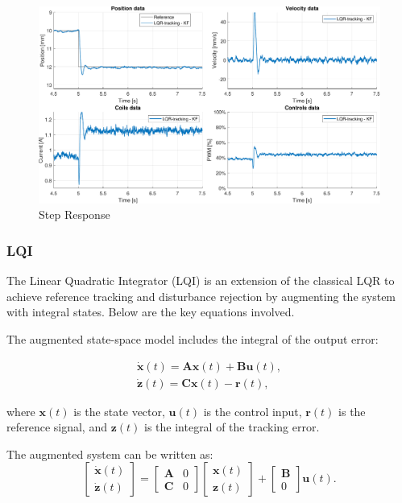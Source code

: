 \begin{figure}[H]
    \centering
    \includegraphics[width=1\linewidth]{./img/MATLAB/results/step_LQR_tracking_KF.pdf}
    \caption{Step Response}
    \label{fig:Step Response}
\end{figure}

\subsubsection{LQI}
\label{subsubsec:lqi}
The Linear Quadratic Integrator (LQI) is an extension of the classical LQR to achieve reference tracking and disturbance rejection by augmenting the system with integral states. Below are the key equations involved.

The augmented state-space model includes the integral of the output error:

\begin{equation}
    \begin{aligned}
        \mathbf{\dot{x}}(t) = \mathbf{A} \mathbf{x}(t) + \mathbf{B} \mathbf{u}(t), \\ \mathbf{\dot{z}}(t) = \mathbf{C} \mathbf{x}(t) - \mathbf{r}(t),
    \end{aligned}
\end{equation}

where $\mathbf{x}(t)$ is the state vector, $\mathbf{u}(t)$ is the control input, $\mathbf{r}(t)$ is the reference signal, and $\mathbf{z}(t)$ is the integral of the tracking error.

The augmented system can be written as:
\begin{equation}
    \begin{bmatrix}
        \mathbf{\dot{x}}(t) \\
        \mathbf{\dot{z}}(t)
    \end{bmatrix}
    =
    \begin{bmatrix}
        \mathbf{A} & 0 \\
        \mathbf{C} & 0
    \end{bmatrix}
    \begin{bmatrix}
        \mathbf{x}(t) \\
        \mathbf{z}(t)
    \end{bmatrix}
    +
    \begin{bmatrix}
        \mathbf{B} \\
        0
    \end{bmatrix}
    \mathbf{u}(t).
\end{equation}

